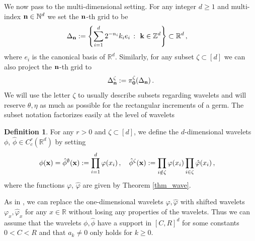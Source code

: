 \documentclass[12pt]{article}
\numberwithin{equation}{section}
\theoremstyle{plain}
\theoremstyle{definition}
\newtheorem{definition}[theorem]{Definition}
\newtheorem{remark}[theorem]{Remark}
\def\bR{\mathbb{R}}\def\bS{\mathbb{S}}
\def\fk{\mathbf k}\def\fl{\mathbf l}
\begin{document}
 We now pass to the multi-dimensional setting. For any integer $d\geq 1$ and multi-index $\mathbf n\in \mathbb{N}^d$ we set the  $\mathbf n$-th grid to be
\begin{align*}
    \Delta_\fn &:= \left \{\sum_{i=1}^d 2^{-n_i}k_i e_i~\colon~\fk\in\bZ^d\right\}\subset\bR^d\,,
\end{align*}
where $e_i$ is the canonical basis of $\mathbb{R}^d$. Similarly, for any  subset $\zeta \subset [d]$ we can also project the $\mathbf n$-th grid to 
\[  
    \Delta^\zeta_\mathbf n :=  \pi^{\zeta}_{\mathbf{0}}(\Delta_\mathbf n)\,.
\]
 We will use the letter $\zeta$ to usually describe subsets regarding wavelets and will reserve $\theta,\eta$ as much as possible for the rectangular increments of a germ.  The subset notation factorizes easily at the level of wavelets
\begin{definition}\label{defn_wavelets}
For any $r>0$  and  $\zeta\subset[d]$, we define the $d$-dimensional wavelets $\phi$, $\hat\phi\in C^r_c(\bR^d)$ by setting 
\begin{align}
\begin{split}\label{def:wavelets}
    \phi(\fx)= \hat{\phi}^{\emptyset}(\fx)&:= \prod_{i=1}^d\varphi(x_i) \,, \quad 
    \hat\phi^\zeta(\fx) := \prod_{i\notin\zeta}\varphi(x_i)\prod_{i\in\zeta}\hat\varphi(x_i)\,,
\end{split}
\end{align}
where the functions  $\varphi$, $\hat\varphi$ are given by Theorem \eqref{thm_wave}.
\end{definition}


 As in \cite{kern2021}, we can replace the one-dimensional wavelets $\varphi,\hat\varphi$ with shifted wavelets $\varphi_x,\hat\varphi_x$ for any $x\in\bR$ without losing any properties of the wavelets. Thus we can assume that the  wavelets $\phi, \hat{\phi}$ have a support in $[C,R]^d$ for some constants $0<C<R$ and that $a_k\neq 0$ only holds for $k\ge 0$.
\end{document}
